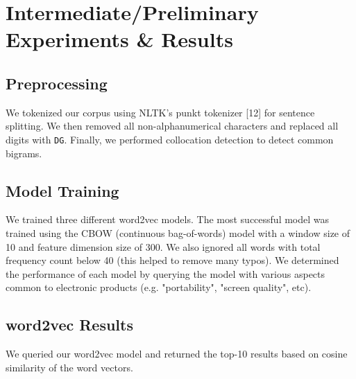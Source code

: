 \documentclass{article} %
\begin{document}
\section{Intermediate/Preliminary Experiments \& Results}
\subsection{Preprocessing} We tokenized our corpus using NLTK's punkt tokenizer [12] for sentence splitting. We then removed all non-alphanumerical characters and replaced all digits with \texttt{DG}. Finally, we performed collocation detection to detect common bigrams.

\subsection{Model Training} We trained three different word2vec models. The most successful model was trained using the CBOW (continuous bag-of-words) model with a window size of 10 and feature dimension size of 300. We also ignored all words with total frequency count below 40 (this helped to remove many typos). We determined the performance of each model by querying the model with various aspects common to electronic products (e.g. "portability", "screen quality", etc).

\subsection{word2vec Results}
We queried our word2vec model and returned the top-10 results based on cosine similarity of the word vectors.
\end{document}

